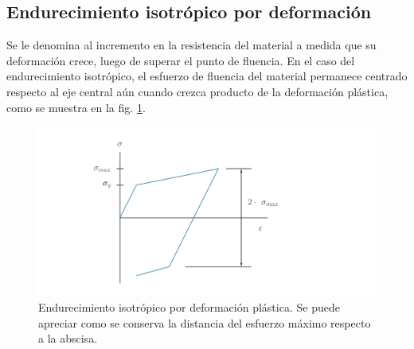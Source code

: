 \subsection{Endurecimiento isotrópico por deformación}
Se le denomina al incremento en la resistencia del material a medida que su deformación crece, luego de superar el punto de fluencia. En el caso del endurecimiento isotrópico, el esfuerzo de fluencia del material permanece centrado respecto al eje central aún cuando crezca producto de la deformación plástica, como se muestra en la fig. \ref{fig:iso_hard}.

\begin{figure}[h]
\centering
\includegraphics[width=1\linewidth]{Imagenes/iso_hard.pdf}
\caption{Endurecimiento isotrópico por deformación plástica. Se puede apreciar como se conserva la distancia del esfuerzo máximo respecto a la abscisa.}
\label{fig:iso_hard}
\end{figure}


